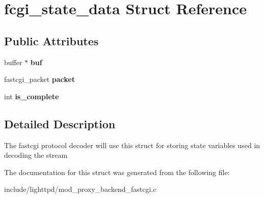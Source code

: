 \hypertarget{structfcgi__state__data}{
\section{fcgi\_\-state\_\-data Struct Reference}
\label{structfcgi__state__data}
}
\subsection*{Public Attributes}
\begin{CompactItemize}
\item 
\hypertarget{structfcgi__state__data_1c08998287de5b4100c2728bb5afa817}{
buffer $\ast$ \textbf{buf}}
\label{structfcgi__state__data_1c08998287de5b4100c2728bb5afa817}

\item 
\hypertarget{structfcgi__state__data_11e9687ecbf38c3b6546169580ec89ba}{
fastcgi\_\-packet \textbf{packet}}
\label{structfcgi__state__data_11e9687ecbf38c3b6546169580ec89ba}

\item 
\hypertarget{structfcgi__state__data_c4b596fcc3f555b84cb215e2190aeed0}{
int \textbf{is\_\-complete}}
\label{structfcgi__state__data_c4b596fcc3f555b84cb215e2190aeed0}

\end{CompactItemize}


\subsection{Detailed Description}
The fastcgi protocol decoder will use this struct for storing state variables used in decoding the stream 

The documentation for this struct was generated from the following file:\begin{CompactItemize}
\item 
include/lighttpd/mod\_\-proxy\_\-backend\_\-fastcgi.c\end{CompactItemize}
